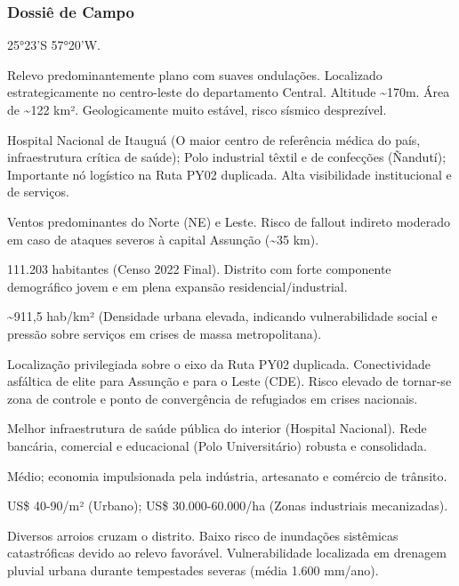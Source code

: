 \subsubsection{Dossiê de Campo}
\begin{description}[style=nextline,leftmargin=0.5cm,font=\bfseries]
\item[Coordenadas]  25°23'S 57°20'W.
\item[Topografia]  Relevo predominantemente plano com suaves ondulações. Localizado estrategicamente no centro-leste do departamento Central. Altitude \textasciitilde 170m. Área de \textasciitilde 122 km². Geologicamente muito estável, risco sísmico desprezível.
\item[Alvos Estratégicos]  Hospital Nacional de Itauguá (O maior centro de referência médica do país, infraestrutura crítica de saúde); Polo industrial têxtil e de confecções (Ñandutí); Importante nó logístico na Ruta PY02 duplicada. Alta visibilidade institucional e de serviços.
\item[Fallout]  Ventos predominantes do Norte (NE) e Leste. Risco de fallout indireto moderado em caso de ataques severos à capital Assunção (\textasciitilde 35 km).
\item[População]  111.203 habitantes (Censo 2022 Final). Distrito com forte componente demográfico jovem e em plena expansão residencial/\allowbreak industrial.
\item[Densidade]  \textasciitilde 911,5 hab/\allowbreak km² (Densidade urbana elevada, indicando vulnerabilidade social e pressão sobre serviços em crises de massa metropolitana).
\item[Vias de Acesso]  Localização privilegiada sobre o eixo da Ruta PY02 duplicada. Conectividade asfáltica de elite para Assunção e para o Leste (CDE). Risco elevado de tornar-se zona de controle e ponto de convergência de refugiados em crises nacionais.
\item[Serviços]  Melhor infraestrutura de saúde pública do interior (Hospital Nacional). Rede bancária, comercial e educacional (Polo Universitário) robusta e consolidada.
\item[Custo de Vida]  Médio; economia impulsionada pela indústria, artesanato e comércio de trânsito.
\item[Preço da Terra]  US\$ 40-90/\allowbreak m² (Urbano); US\$ 30.000-60.000/\allowbreak ha (Zonas industriais mecanizadas).
\item[Hidrologia]  Diversos arroios cruzam o distrito. Baixo risco de inundações sistêmicas catastróficas devido ao relevo favorável. Vulnerabilidade localizada em drenagem pluvial urbana durante tempestades severas (média 1.600 mm/\allowbreak ano).

\end{description}
